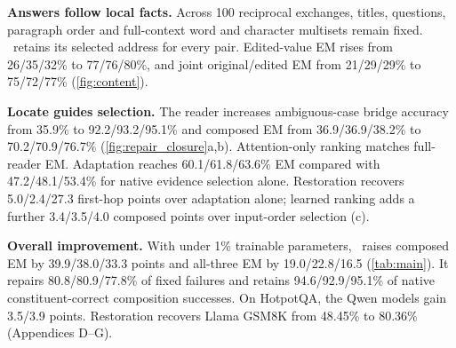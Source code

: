 \textbf{Answers follow local facts.}\label{sec:content_results} Across 100 reciprocal exchanges, titles, questions, paragraph order and full-context word and character multisets remain fixed. \method\ retains its selected address for every pair. Edited-value EM rises from 26/35/32\% to 77/76/80\%, and joint original/edited EM from 21/29/29\% to 75/72/77\% (\cref{fig:content}).

\textbf{Locate guides selection.} The reader increases ambiguous-case bridge accuracy from 35.9\% to 92.2/93.2/95.1\% and composed EM from 36.9/36.9/38.2\% to 70.2/70.9/76.7\% (\cref{fig:repair_closure}a,b). Attention-only ranking matches full-reader EM. Adaptation reaches 60.1/61.8/63.6\% EM compared with 47.2/48.1/53.4\% for native evidence selection alone. Restoration recovers 5.0/2.4/27.3 first-hop points over adaptation alone; learned ranking adds a further 3.4/3.5/4.0 composed points over input-order selection (c).

\textbf{Overall improvement.} With under 1\% trainable parameters, \method\ raises composed EM by 39.9/38.0/33.3 points and all-three EM by 19.0/22.8/16.5 (\cref{tab:main}). It repairs 80.8/80.9/77.8\% of fixed failures and retains 94.6/92.9/95.1\% of native constituent-correct composition successes. On HotpotQA, the Qwen models gain 3.5/3.9 points. Restoration recovers Llama GSM8K from 48.45\% to 80.36\% (Appendices D--G).
